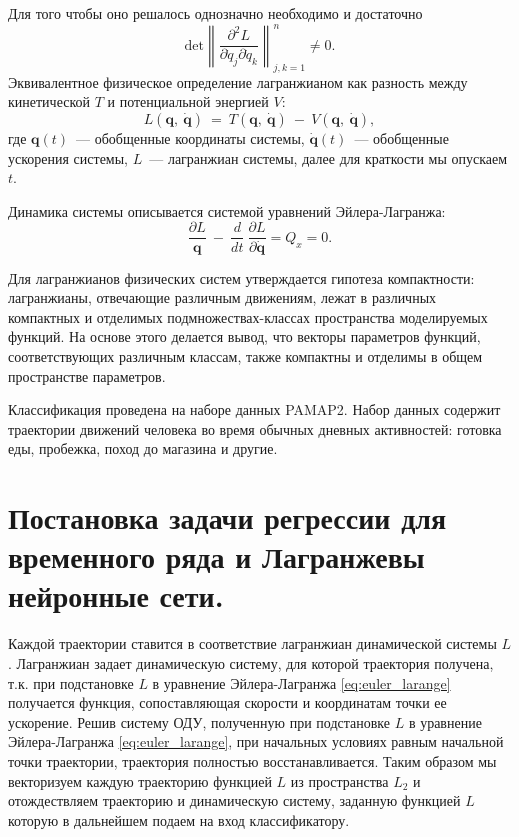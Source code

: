 \documentclass[12pt, twoside]{article}
\begin{document}
Для того чтобы оно решалось однозначно необходимо и достаточно
\begin{equation}
    \text{det} \left \| \frac{\partial^{2} L}{\partial \dot{q}_{j}\partial \dot{q}_{k}} \right \|_{j,k=1}^{n} \neq 0.
\end{equation}
Эквивалентное физическое определение лагранжианом как разность между кинетической $T$ и потенциальной энергией $V$: 
\begin{equation}
L\left(\mathbf{q},\ \dot{\mathbf{q}}\right) \ =\ T\left(\mathbf{q},\ \dot{\mathbf{q}}\right)\ -\ V\left(\mathbf{q},\ \dot{\mathbf{q}}\right), 
\end{equation}
где $\mathbf{q}(t)$~--- обобщенные координаты системы, $\dot{\mathbf{q}}(t)$~--- обобщенные ускорения системы, $L$~--- лагранжиан системы, далее для краткости мы опускаем $t$.

Динамика системы описывается системой уравнений Эйлера-Лагранжа:
\begin{equation}
 \frac{\partial L}{\mathbf{q}}\ -\ \frac{d}{dt}\ \frac{\partial L}{\partial\dot{\mathbf{q}}}=Q_x=0. \label{eq:euler_larange}
\end{equation}

Для лагранжианов физических систем утверждается гипотеза компактности: лагранжианы, отвечающие различным движениям, лежат в различных компактных и отделимых подмножествах-классах пространства моделируемых функций. На основе этого делается вывод, что векторы параметров функций, соответствующих различным классам, также компактны и отделимы в общем пространстве параметров. 

Классификация проведена на наборе данных PAMAP2. Набор данных содержит траектории движений человека во время обычных дневных активностей: готовка еды, пробежка, поход до магазина и другие.

\section{Постановка задачи регрессии для временного ряда и  Лагранжевы нейронные сети.} \label{sec:regression}

Каждой траектории ставится в соответствие лагранжиан динамической системы $L$. Лагранжиан задает динамическую систему, для которой траектория получена, т.к. при подстановке $L$ в уравнение Эйлера-Лагранжа \eqref{eq:euler_larange} получается функция, сопоставляющая скорости и координатам точки ее ускорение. Решив систему ОДУ, полученную при подстановке $L$ в уравнение Эйлера-Лагранжа \eqref{eq:euler_larange}, при начальных условиях равным начальной точки траектории, траектория полностью восстанавливается. Таким образом мы векторизуем каждую траекторию функцией $L$ из пространства $L_2$ и отождествляем траекторию и динамическую систему, заданную функцией  $L$ которую в дальнейшем подаем на вход классификатору.
\end{document}

